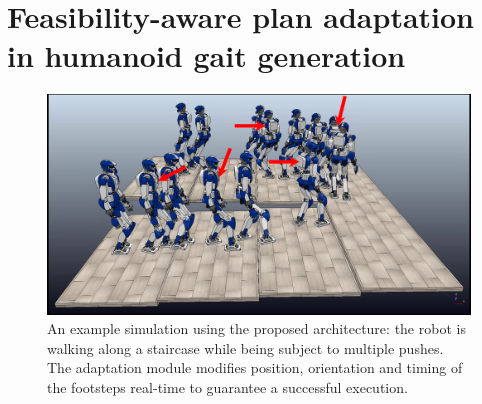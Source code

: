 \chapter{Feasibility-aware plan adaptation in humanoid gait generation}


\begin{figure}
    \centering
    \includegraphics[trim={0.5cm 1.5cm 2cm 0.1cm},clip,width=0.9\columnwidth]{figures/strobo-staircase-with-pushes.png}
    \caption{An example simulation using the proposed architecture: the robot is walking along a staircase while being subject to multiple pushes. The adaptation module modifies position, orientation and timing of the footsteps real-time to guarantee a successful execution.}
    \label{fig:FAPA:two-patches-mixed-integer-snapshots}
\end{figure}

